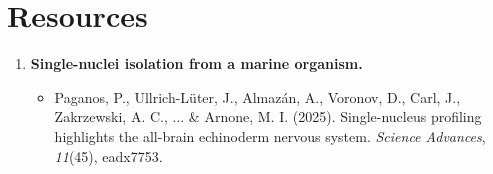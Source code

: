 \documentclass[10pt]{report}
\begin{document}
\section*{\textendash{} Resources \textendash{}}

\begin{enumerate}
	\item \textbf{Single-nuclei isolation from a marine organism.}
		\begin{itemize}
			\item Paganos, P., Ullrich-Lüter, J., Almazán, A., Voronov, D., Carl, J., Zakrzewski, A. C., ... \& Arnone, M. I. (2025). Single-nucleus profiling highlights the all-brain echinoderm nervous system. \textit{Science Advances}, \textit{11}(45), eadx7753. 
		\end{itemize}
\end{enumerate}
\end{document}
